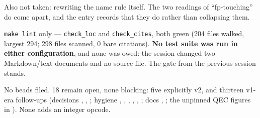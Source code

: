 Also not taken: rewriting the name rule itself. The two readings of ``fp-touching'' do come
apart, and the entry records that they do rather than collapsing them.

\texttt{make lint} only --- \texttt{check\_loc} and \texttt{check\_cites}, both green (204
files walked, largest 294; 298 files scanned, 0 bare citations). \textbf{No test suite was
run in either configuration}, and none was owed: the session changed two Markdown/text
documents and no source file. The gate from the previous session stands.

No beads filed. 18 remain open, none blocking: five explicitly v2, and thirteen v1-era
follow-ups (decisions , , ; hygiene , ,
, , , ; docs , ; the unpinned
QEC figures in ). None adds an integer opcode.

